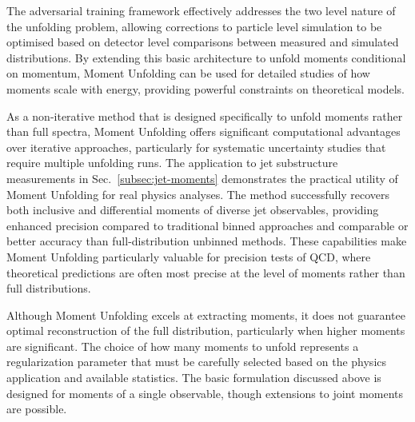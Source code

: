     The adversarial training framework effectively addresses the two level nature of the unfolding problem, allowing corrections to particle level simulation to be optimised based on detector level comparisons between measured and simulated distributions.
    By extending this basic architecture to unfold moments conditional on momentum, Moment Unfolding can be used for detailed studies of how moments scale with energy, providing powerful constraints on theoretical models.
    
    As a non-iterative method that is designed specifically to unfold moments rather than full spectra, Moment Unfolding offers significant computational advantages over iterative approaches, particularly for systematic uncertainty studies that require multiple unfolding runs.
    The application to jet substructure measurements in Sec.~\ref{subsec:jet-moments} demonstrates the practical utility of Moment Unfolding for real physics analyses.
    The method successfully recovers both inclusive and differential moments of diverse jet observables, providing enhanced precision compared to traditional binned approaches and comparable or better accuracy than full-distribution unbinned methods.
    These capabilities make Moment Unfolding particularly valuable for precision tests of QCD, where theoretical predictions are often most precise at the level of moments rather than full distributions.
    
    Although Moment Unfolding excels at extracting moments, it does not guarantee optimal reconstruction of the full distribution, particularly when higher moments are significant.
    The choice of how many moments to unfold represents a regularization parameter that must be carefully selected based on the physics application and available statistics.
    The basic formulation discussed above is designed for moments of a single observable, though extensions to joint moments are possible.
